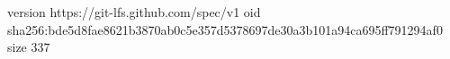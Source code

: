 version https://git-lfs.github.com/spec/v1
oid sha256:bde5d8fae8621b3870ab0c5e357d5378697de30a3b101a94ca695ff791294af0
size 337
